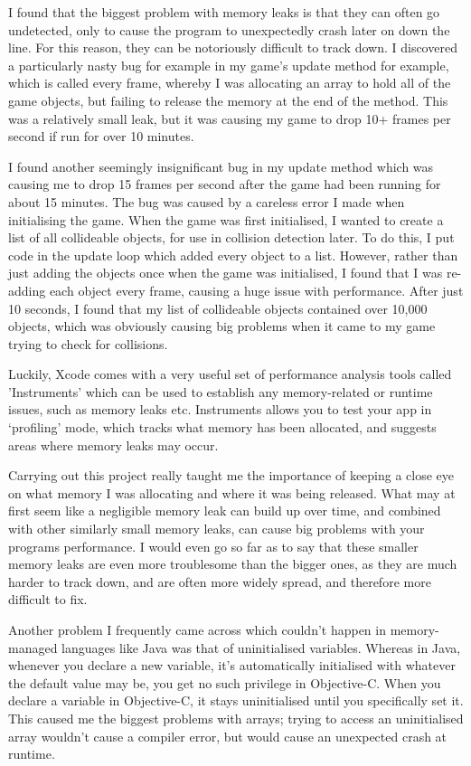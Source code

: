 \documentclass[a4paper,oneside]{report}
\begin{document}
I found that the biggest problem with memory leaks is that they can often go undetected, only to cause the program to unexpectedly crash later on down the line. For this reason, they can be notoriously difficult to track down. I discovered a particularly nasty bug for example in my game's update method for example, which is called every frame, whereby I was allocating an array to hold all of the game objects, but failing to release the memory at the end of the method. This was a relatively small leak, but it was causing my game to drop 10+ frames per second if run for over 10 minutes.

I found another seemingly insignificant bug in my update method which was causing me to drop 15 frames per second after the game had been running for about 15 minutes. The bug was caused by a careless error I made when initialising the game. When the game was first initialised, I wanted to create a list of all collideable objects, for use in collision detection later. To do this, I put code in the update loop which added every object to a list. However, rather than just adding the objects once when the game was initialised, I found that I was re-adding each object every frame, causing a huge issue with performance. After just 10 seconds, I found that my list of collideable objects contained over 10,000 objects, which was obviously causing big problems when it came to my game trying to check for collisions.

Luckily, Xcode comes with a very useful set of performance analysis tools called 'Instruments' which can be used to establish any memory-related or runtime issues, such as memory leaks etc. Instruments allows you to test your app in `profiling' mode, which tracks what memory has been allocated, and suggests areas where memory leaks may occur.

Carrying out this project really taught me the importance of keeping a close eye on what memory I was allocating and where it was being released. What may at first seem like a negligible memory leak can build up over time, and combined with other similarly small memory leaks, can cause big problems with your programs performance. I would even go so far as to say that these smaller memory leaks are even more troublesome than the bigger ones, as they are much harder to track down, and are often more widely spread, and therefore more difficult to fix.

Another problem I frequently came across which couldn't happen in memory-managed languages like Java was that of uninitialised variables. Whereas in Java, whenever you declare a new variable, it's automatically initialised with whatever the default value may be, you get no such privilege in Objective-C. When you declare a variable in Objective-C, it stays uninitialised until you specifically set it. This caused me the biggest problems with arrays; trying to access an uninitialised array wouldn't cause a compiler error, but would cause an unexpected crash at runtime.
\end{document}
